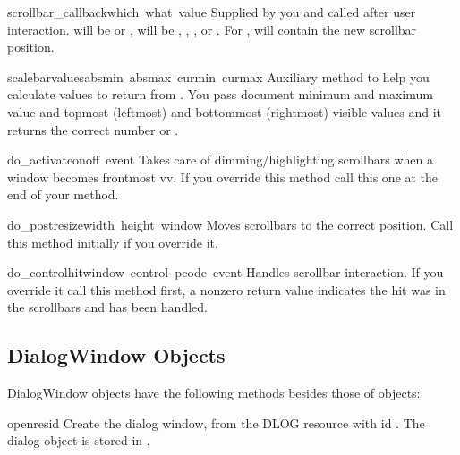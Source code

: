 \begin{funcdesc}{scrollbar_callback}{which\, what\, value}
Supplied by you and called after user interaction.  will
be  or ,  will be ,
, ,  or . For
,  will contain the new scrollbar position.
\end{funcdesc}

\begin{funcdesc}{scalebarvalues}{absmin\, absmax\, curmin\, curmax}
Auxiliary method to help you calculate values to return from
. You pass document minimum and maximum value
and topmost (leftmost) and bottommost (rightmost) visible values and
it returns the correct number or .
\end{funcdesc}

\begin{funcdesc}{do_activate}{onoff\, event}
Takes care of dimming/highlighting scrollbars when a window becomes
frontmost vv. If you override this method call this one at the end of
your method.
\end{funcdesc}

\begin{funcdesc}{do_postresize}{width\, height\, window}
Moves scrollbars to the correct position. Call this method initially
if you override it.
\end{funcdesc}

\begin{funcdesc}{do_controlhit}{window\, control\, pcode\, event}
Handles scrollbar interaction. If you override it call this method
first, a nonzero return value indicates the hit was in the scrollbars
and has been handled.
\end{funcdesc}

\subsection{DialogWindow Objects}

DialogWindow objects have the following methods besides those of
 objects:

\renewcommand{\indexsubitem}{(DialogWindow method)}

\begin{funcdesc}{open}{resid}
Create the dialog window, from the DLOG resource with id
. The dialog object is stored in .
\end{funcdesc}


